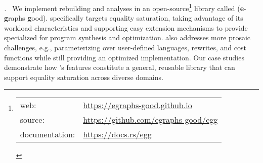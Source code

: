 \textit{\Egg. $\,$}
%
We implement rebuilding and \eclass analyses in
  an open-source\footnote{
    \begin{tabular}[t]{ll}
      web: & \url{https://egraphs-good.github.io}\\
      source: & \url{https://github.com/egraphs-good/egg}\\
      documentation: & \url{https://docs.rs/egg}
    \end{tabular}
  }
  library called \egg (\textbf{e}-\textbf{g}raphs \textbf{g}ood).
\Egg specifically targets equality saturation,
  taking advantage of its workload characteristics and
  supporting easy extension mechanisms to
  provide \egraphs specialized for
  program synthesis and optimization.
\Egg also addresses more prosaic challenges,
  e.g., parameterizing over user-defined
  languages, rewrites, and cost functions
  while still providing an optimized implementation.
Our case studies demonstrate how \egg's features
  constitute a general, reusable \egraph library that can
  support equality saturation across diverse domains.


